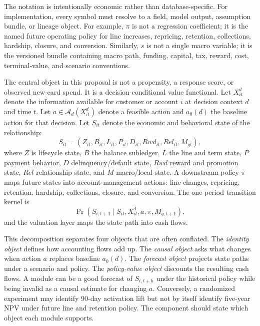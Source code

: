 \documentclass[11pt]{article}
\newcommand{\1}{\mathbf{1}}
\begin{document}
The notation is intentionally economic rather than database-specific. For
implementation, every symbol must resolve to a field, model output, assumption
bundle, or lineage object. For example, $\pi$ is not a regression coefficient;
it is the named future operating policy for line increases, repricing,
retention, collections, hardship, closure, and conversion. Similarly, $s$ is
not a single macro variable; it is the versioned bundle containing macro path,
funding, capital, tax, reward, cost, terminal-value, and scenario conventions.

The central object in this proposal is not a propensity, a response score, or
observed new-card spend. It is a decision-conditional value functional. Let
$X_{it}^{d}$ denote the information available for customer or account $i$ at
decision context $d$ and time $t$. Let $a\in\mathcal{A}_d(X_{it}^{d})$ denote
a feasible action and $a_0(d)$ the baseline action for that decision. Let
$S_{it}$ denote the economic and behavioral state of the relationship:
\[
  S_{it}
  =
  (Z_{it},B_{it},L_{it},P_{it},D_{it},Rwd_{it},Rel_{it},M_{gt}),
\]
where $Z$ is lifecycle state, $B$ the balance subledger, $L$ the line and term
state, $P$ payment behavior, $D$ delinquency/default state, $Rwd$ reward and
promotion state, $Rel$ relationship state, and $M$ macro/local state. A
downstream policy $\pi$ maps future states into account-management actions:
line changes, repricing, retention, hardship, collections, closure, and
conversion. The one-period transition kernel is
\begin{equation}
  \Pr(S_{i,t+1}\mid S_{it},X_{it}^{d},a,\pi,M_{g,t+1}),
  \label{eq:state-kernel-panel}
\end{equation}
and the valuation layer maps the state path into cash flows.

This decomposition separates four objects that are often conflated. The
\emph{identity object} defines how accounting flows add up. The
\emph{causal object} asks what changes when action $a$ replaces baseline
$a_0(d)$. The \emph{forecast object} projects state paths under a scenario and
policy. The \emph{policy-value object} discounts the resulting cash flows. A
module can be a good forecast of $S_{i,t+h}$ under the historical policy while
being invalid as a causal estimate for changing $a$. Conversely, a randomized
experiment may identify 90-day activation lift but not by itself identify
five-year NPV under future line and retention policy. The component should
state which object each module supports.
\end{document}
